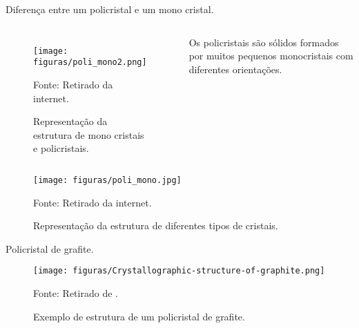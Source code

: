 \documentclass[aspectratio=169,12.5pt,xcolor=dvipsnames]{beamer}
\begin{document}
\begin{frame}{Diferença entre um policristal e um mono cristal.}

    \begin{columns}[c]
      

        \begin{figure}
          \centering
          \caption{Representação da estrutura de mono cristais e policristais.}
          \texttt{[image: figuras/poli\_mono2.png]}\par
          {\scriptsize Fonte: Retirado da internet.}
        \end{figure}

        Os policristais são sólidos formados por muitos pequenos monocristais com diferentes
orientações.

    \end{columns}

    
\end{frame}

\begin{frame}

        \begin{center}
        \begin{figure}
          \caption{Representação da estrutura de diferentes tipos de cristais.}
        \texttt{[image: figuras/poli\_mono.jpg]}\par
          {\scriptsize Fonte: Retirado da internet.}
        \end{figure}
        \end{center}



    
\end{frame}

\begin{frame}{Policristal de grafite.}

        \begin{center}
        \begin{figure}
        \caption{Exemplo de estrutura de um policristal de grafite.}
        \vspace*{-0.25cm}
        \texttt{[image: figuras/Crystallographic-structure-of-graphite.png]}\par
        {\scriptsize Fonte: Retirado de \cite{STEFANESCU2016102}.}
        \end{figure}
        \end{center}
    
\end{frame}
\end{document}
